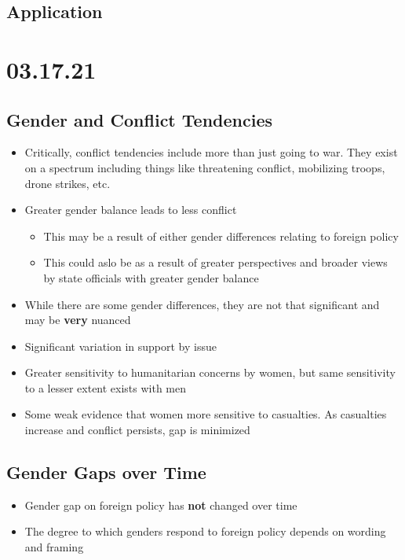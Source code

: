 \documentclass[11pt]{article}
\begin{document}
\subsection*{Application}
\label{sec:orgae53a53}
\section*{03.17.21}
\label{sec:orgbdf773c}
\subsection*{Gender and Conflict Tendencies}
\label{sec:orgb691d49}
\begin{itemize}
\item Critically, conflict tendencies include more than just going to war. They exist on a spectrum including things like threatening conflict, mobilizing troops, drone strikes, etc.
\item Greater gender balance leads to less conflict
\begin{itemize}
\item This may be a result of either gender differences relating to foreign policy
\item This could aslo be as a result of greater perspectives and broader views by state officials with greater gender balance
\end{itemize}
\item While there are some gender differences, they are not that significant and may be \textbf{very} nuanced
\item Significant variation in support by issue
\item Greater sensitivity to humanitarian concerns by women, but same sensitivity to a lesser extent exists with men
\item Some weak evidence that women more sensitive to casualties. As casualties increase and conflict persists, gap is minimized
\end{itemize}
\subsection*{Gender Gaps over Time}
\label{sec:org76984f8}
\begin{itemize}
\item Gender gap on foreign policy has \textbf{not} changed over time
\item The degree to which genders respond to foreign policy depends on wording and framing
\end{itemize}
\end{document}
